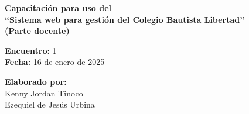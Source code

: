 \begin{center} \textbf
{
    \Large Capacitación para uso del\\ ``Sistema web para gestión del Colegio Bautista Libertad''\\ (Parte docente)
}
\end{center}

\begin{multicols}{2}
{
    \textbf{Encuentro:} 1\\
    \textbf{Fecha:} 16 de enero de 2025\\
    \begin{flushright}
        \textbf{Elaborado por:}\\
        Kenny Jordan Tinoco\\
        Ezequiel de Jesús Urbina
    \end{flushright}
}
\end{multicols}

\thispagestyle{first-page-style}